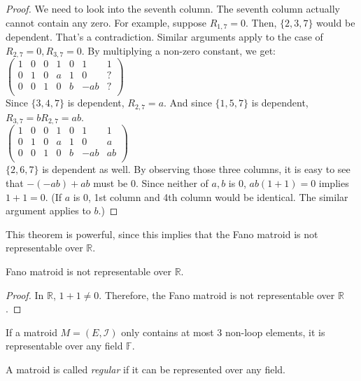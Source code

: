 \begin{proof}
We need to look into the seventh column.
The seventh column actually cannot contain any zero.
For example, suppose $R_{1, 7} = 0$.
Then, $\{2, 3, 7 \}$ would be dependent.
That's a contradiction.
Similar arguments apply to the case of $R_{2, 7} = 0, R_{3, 7} = 0$.
By multiplying a non-zero constant, we get:\\
$\begin{pmatrix}
1 & 0 & 0 & 1 & 0 & 1 & 1 \\
0 & 1 & 0 & a & 1 & 0 & ? \\
0 & 0 & 1 & 0 & b & -ab & ? \\
\end{pmatrix}$\\
Since $\{3, 4, 7\}$ is dependent, $R_{2, 7} = a$.
And since $\{1, 5, 7\}$ is dependent, $R_{3, 7} = b R_{2, 7} = ab$.\\
$\begin{pmatrix}
1 & 0 & 0 & 1 & 0 & 1 & 1 \\
0 & 1 & 0 & a & 1 & 0 & a \\
0 & 0 & 1 & 0 & b & -ab & ab \\
\end{pmatrix}$\\
$\{ 2, 6, 7 \}$ is dependent as well.
By observing those three columns, it is easy to see that $-(-ab) + ab$ must be 0.
Since neither of $a, b$ is 0, $ab(1 + 1) = 0$ implies $1 + 1 = 0$.
(If $a$ is 0, 1st column and 4th column would be identical. The similar argument applies to $b$.)
\end{proof}

This theorem is powerful, since this implies that the Fano matroid is not representable over $\mathbb{R}$.

\begin{cor}
Fano matroid is not representable over $\mathbb{R}$.
\end{cor}

\begin{proof}
In $\mathbb{R}$, $1 + 1 \neq 0$. Therefore, the Fano matroid is not representable over $\mathbb{R}$.
\end{proof}


\begin{thm}
If a matroid $M = (E, \mathcal{I})$ only contains at most 3 non-loop elements, it is representable over any field $\mathbb{F}$.
\end{thm}

A matroid is called \textit{regular} if it can be represented over any field.

